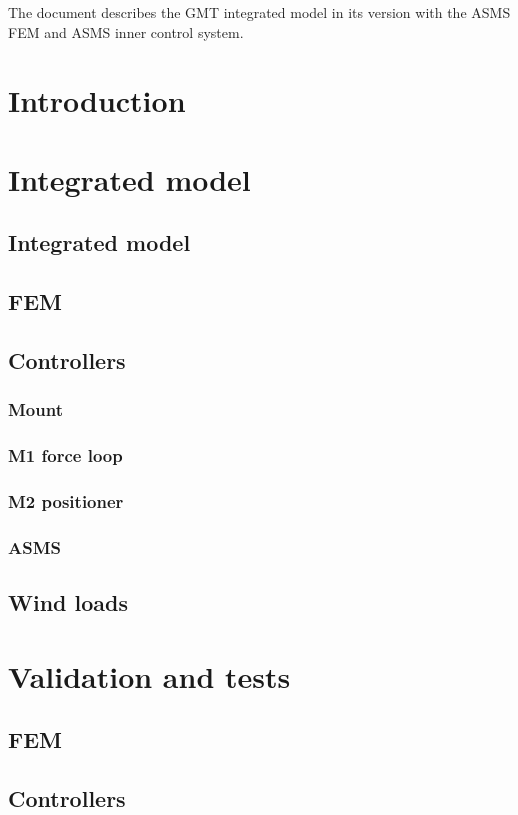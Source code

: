 \documentclass{gmto}
\begin{document}
The document describes the GMT integrated model in its version with the ASMS FEM
and ASMS inner control system.

\section{Introduction}
\label{sec:introduction}

\section{Integrated model}

\subsection{Integrated model}
\label{sec:im}

\subsection{FEM}
\label{sec:fem}



\subsection{Controllers}
\label{sec:ctrlr}



\subsubsection{Mount}
\label{sec:mount-ctrlr}

\subsubsection{M1 force loop}
\label{sec:m1-ctrlr}

\subsubsection{M2 positioner}
\label{sec:m2-ctrlr}

\subsubsection{ASMS}
\label{sec:asms-ctrlr}

\subsection{Wind loads}
\label{sec:wind-loads}

\appendix

\section{Validation and tests}
\label{sec:tests}

\subsection{FEM}
\label{sec:fem-tests}

\subsection{Controllers}
\label{sec:ctrlr-tests}




\printbibliography
\end{document}
